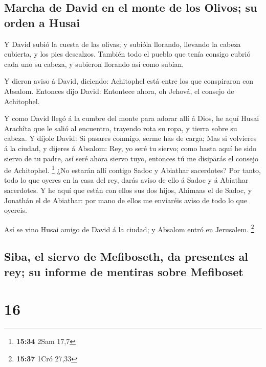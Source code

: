 \hypertarget{marcha-de-david-en-el-monte-de-los-olivos-su-orden-a-husai}{%
\subsection{Marcha de David en el monte de los Olivos; su orden a
Husai}\label{marcha-de-david-en-el-monte-de-los-olivos-su-orden-a-husai}}

 Y David subió la cuesta de las olivas; y subióla llorando,
llevando la cabeza cubierta, y los pies descalzos. También todo el
pueblo que tenía consigo cubrió cada uno su cabeza, y subieron llorando
así como subían.

 Y dieron aviso á David, diciendo: Achitophel está entre
los que conspiraron con Absalom. Entonces dijo David: Entontece ahora,
oh Jehová, el consejo de Achitophel.

 Y como David llegó á la cumbre del monte para adorar allí
á Dios, he aquí Husai Arachîta que le salió al encuentro, trayendo rota
su ropa, y tierra sobre su cabeza.  Y díjole David: Si
pasares conmigo, serme has de carga;  Mas si volvieres á la
ciudad, y dijeres á Absalom: Rey, yo seré tu siervo; como hasta aquí he
sido siervo de tu padre, así seré ahora siervo tuyo, entonces tú me
disiparás el consejo de Achitophel. \footnote{\textbf{15:34} 2Sam 17,7}
 ¿No estarán allí contigo Sadoc y Abiathar sacerdotes? Por
tanto, todo lo que oyeres en la casa del rey, darás aviso de ello á
Sadoc y á Abiathar sacerdotes.  Y he aquí que están con
ellos sus dos hijos, Ahimaas el de Sadoc, y Jonathán el de Abiathar: por
mano de ellos me enviaréis aviso de todo lo que oyereis.

 Así se vino Husai amigo de David á la ciudad; y Absalom
entró en Jerusalem. \footnote{\textbf{15:37} 1Cró 27,33}

\hypertarget{siba-el-siervo-de-mefiboseth-da-presentes-al-rey-su-informe-de-mentiras-sobre-mefiboset}{%
\subsection{Siba, el siervo de Mefiboseth, da presentes al rey; su
informe de mentiras sobre
Mefiboset}\label{siba-el-siervo-de-mefiboseth-da-presentes-al-rey-su-informe-de-mentiras-sobre-mefiboset}}

\hypertarget{section-15}{%
\section{16}\label{section-15}}

